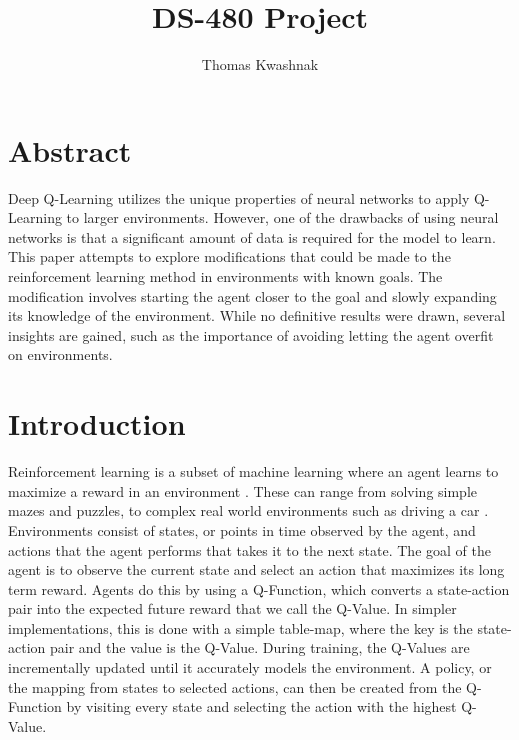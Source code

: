 \documentclass[12pt]{article}
\author{Thomas Kwashnak}
\title{DS-480 Project}
\begin{document}
\maketitle

\newpage

\section{Abstract}

Deep Q-Learning utilizes the unique properties of neural networks to apply Q-Learning to larger environments.
However, one of the drawbacks of using neural networks is that a significant amount of data is required for the model to learn.
This paper attempts to explore modifications that could be made to the reinforcement learning method in environments with known goals.
The modification involves starting the agent closer to the goal and slowly expanding its knowledge of the environment.
While no definitive results were drawn, several insights are gained, such as the importance of avoiding letting the agent overfit on environments.

\section{Introduction}

Reinforcement learning is a subset of machine learning where an agent learns to maximize a reward in an environment \cite{article_reinforcement_learning_survey}.
These can range from solving simple mazes and puzzles, to complex real world environments such as driving a car \cite{article_deep_learning_hybrid_quantum}.
Environments consist of states, or points in time observed by the agent, and actions that the agent performs that takes it to the next state.
The goal of the agent is to observe the current state and select an action that maximizes its long term reward.
Agents do this by using a Q-Function, which converts a state-action pair into the expected future reward that we call the Q-Value.
In simpler implementations, this is done with a simple table-map, where the key is the state-action pair and the value is the Q-Value.
During training, the Q-Values are incrementally updated until it accurately models the environment.
A policy, or the mapping from states to selected actions, can then be created from the Q-Function by visiting every state and selecting the action with the highest Q-Value.
\end{document}
